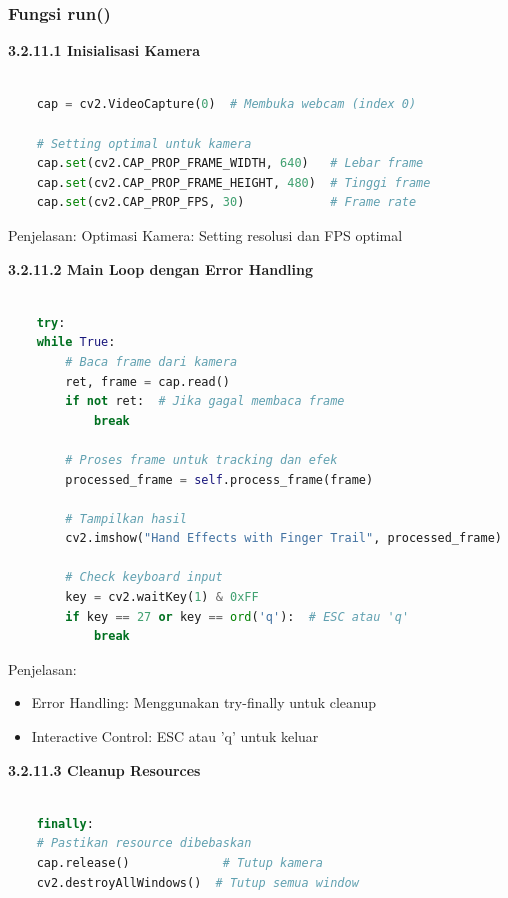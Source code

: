 \documentclass[11pt,a4paper]{article}
\begin{document}
    \subsubsection{Fungsi run()}
    \noindent\textbf{3.2.11.1 Inisialisasi Kamera}
    \begin{lstlisting}[language=Python, caption=Inisialisasi Kamera]
    
    cap = cv2.VideoCapture(0)  # Membuka webcam (index 0)

    # Setting optimal untuk kamera
    cap.set(cv2.CAP_PROP_FRAME_WIDTH, 640)   # Lebar frame
    cap.set(cv2.CAP_PROP_FRAME_HEIGHT, 480)  # Tinggi frame
    cap.set(cv2.CAP_PROP_FPS, 30)            # Frame rate
    \end{lstlisting}
    Penjelasan: Optimasi Kamera: Setting resolusi dan FPS optimal

    \noindent\textbf{3.2.11.2 Main Loop dengan Error Handling}
    \begin{lstlisting}[language=Python, caption=Main Loop dengan Error Handling]
    
    try:
    while True:
        # Baca frame dari kamera
        ret, frame = cap.read()
        if not ret:  # Jika gagal membaca frame
            break
        
        # Proses frame untuk tracking dan efek
        processed_frame = self.process_frame(frame)
        
        # Tampilkan hasil
        cv2.imshow("Hand Effects with Finger Trail", processed_frame)
        
        # Check keyboard input
        key = cv2.waitKey(1) & 0xFF
        if key == 27 or key == ord('q'):  # ESC atau 'q'
            break
    \end{lstlisting}
    Penjelasan: 
    \begin{itemize}
        \item Error Handling: Menggunakan try-finally untuk cleanup
        \item Interactive Control: ESC atau 'q' untuk keluar
    \end{itemize}

    \noindent\textbf{3.2.11.3 Cleanup Resources}
    \begin{lstlisting}[language=Python, caption=Cleanup Resources]
    
    finally:
    # Pastikan resource dibebaskan
    cap.release()             # Tutup kamera
    cv2.destroyAllWindows()  # Tutup semua window
    \end{lstlisting}
\end{document}
